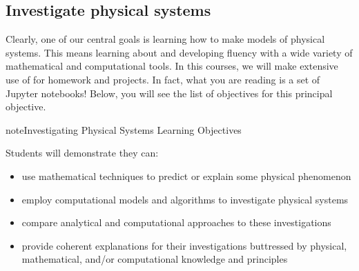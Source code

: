 \documentclass[letterpaper,10pt,english]{jupyterBook}
\begin{document}
\subsection{Investigate physical systems}
\label{\detokenize{content/0_course/1_goals:investigate-physical-systems}}
\sphinxAtStartPar
Clearly, one of our central goals is learning how to make models of physical systems. This means learning about and developing fluency with a wide variety of mathematical and computational tools. In this courses, we will make extensive use of  for homework and projects. In fact, what you are reading is a set of Jupyter notebooks! Below, you will see the list of objectives for this principal objective.

\begin{sphinxadmonition}{note}{Investigating Physical Systems Learning Objectives}

\sphinxAtStartPar
Students will demonstrate they can:
\begin{itemize}
\item {} 
\sphinxAtStartPar
use mathematical techniques to predict or explain some physical phenomenon

\item {} 
\sphinxAtStartPar
employ computational models and algorithms to investigate physical systems

\item {} 
\sphinxAtStartPar
compare analytical and computational approaches to these investigations

\item {} 
\sphinxAtStartPar
provide coherent explanations for their investigations buttressed by physical, mathematical, and/or computational knowledge and principles

\end{itemize}
\end{sphinxadmonition}
\end{document}
